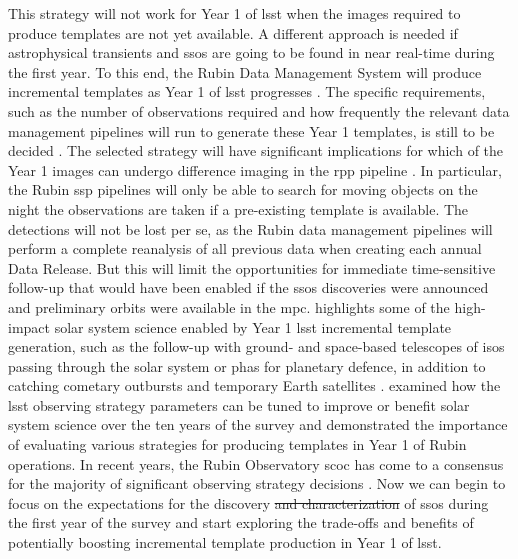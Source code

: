 \documentclass[preprintm,linenumbers]{aastex631}
\begin{document}
This strategy will not work for Year 1 of \gls*{lsst} when the images required to produce templates are not yet available.  A different approach is needed if astrophysical transients and \glspl*{sso} are going to be found in near real-time during the first year. To this end, the Rubin Data Management System will produce incremental templates as Year 1 of \gls*{lsst} progresses \citep{RTN-011}. %
	The specific requirements, such as the number of observations required and how frequently the relevant data management pipelines will run to generate these Year 1 templates, is still to be decided \citep{SCOC_Report_3}. The selected strategy will have significant implications for which of the Year 1 images can undergo difference imaging in the \gls*{rpp} pipeline \citep{DMTN-107,RTN-011}. 
	In particular, the Rubin \gls*{ssp} pipelines will only be able to search for moving objects on the night the observations are taken if a pre-existing template is available. 
	The detections will not be lost per se, as the Rubin data management pipelines will perform a complete reanalysis of all previous data when creating each annual Data Release.
    But this will limit the opportunities for immediate time-sensitive follow-up that would have been enabled if the \glspl*{sso} discoveries were announced and preliminary orbits were available in the \gls*{mpc}.
 \cite{2021RNAAS...5..143S} highlights some of the high-impact solar system science enabled by Year 1 \gls*{lsst} incremental template generation, such as the follow-up with ground- and space-based telescopes of \glspl*{iso} passing through the solar system or \glspl*{pha} for planetary defence, in addition to catching cometary outbursts and temporary Earth satellites \citep[known as ``mini-moons'',][]{bolinCharacterizationTemporarilyCaptured2020,fedoretsEstablishingEarthMinimoon2020}. 
	\cite{schwambTuningLegacySurvey2023} examined how the \gls*{lsst} observing strategy parameters can be tuned to improve or benefit solar system science over the ten years of the survey and demonstrated the importance of evaluating various strategies for producing templates in Year 1 of Rubin operations. 
 In recent years, the Rubin Observatory \gls*{scoc} has come to a consensus for the majority of significant observing strategy decisions \citep{SCOC_Report_1, SCOC_Report_2,SCOC_Report_3}. Now we can begin to focus on the expectations for the discovery \sout{and characterization} of \glspl*{sso} during the first year of the survey and start exploring the trade-offs and benefits of potentially boosting incremental template production in Year 1 of \gls*{lsst}. 
 
\end{document}
